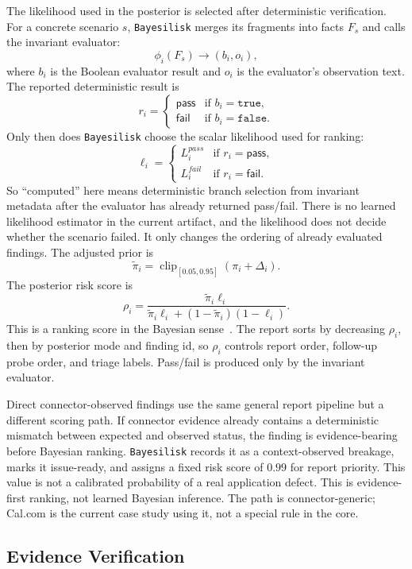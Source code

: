 \documentclass[10pt]{article}
\newcommand{\tool}{\texttt{Bayesilisk}\xspace}
\newcommand{\Pass}{\mathsf{pass}}
\newcommand{\Fail}{\mathsf{fail}}
\begin{document}
The likelihood used in the posterior is selected after deterministic
verification. For a concrete scenario \(s\), \tool merges its fragments into
facts \(F_s\) and calls the invariant evaluator:
\[
  \phi_i(F_s) \rightarrow (b_i,o_i),
\]
where \(b_i\) is the Boolean evaluator result and \(o_i\) is the evaluator's
observation text. The reported deterministic result is
\[
  r_i =
  \begin{cases}
    \Pass & \text{if } b_i=\texttt{true},\\
    \Fail & \text{if } b_i=\texttt{false}.
  \end{cases}
\]
Only then does \tool choose the scalar likelihood used for ranking:
\[
  \ell_i =
  \begin{cases}
    L_i^{pass} & \text{if } r_i=\Pass,\\
    L_i^{fail} & \text{if } r_i=\Fail.
  \end{cases}
\]
So ``computed'' here means deterministic branch selection from invariant
metadata after the evaluator has already returned pass/fail. There is no learned
likelihood estimator in the current artifact, and the likelihood does not
decide whether the scenario failed. It only changes the ordering of already
evaluated findings. The adjusted prior is
\[
  \tilde{\pi}_i = \operatorname{clip}_{[0.05,0.95]}(\pi_i + \Delta_i).
\]
The posterior risk score is
\[
  \rho_i =
  \frac{\tilde{\pi}_i \ell_i}
       {\tilde{\pi}_i \ell_i + (1-\tilde{\pi}_i)(1-\ell_i)}.
\]
This is a ranking score in the Bayesian sense~\cite{bishop2006pattern}. The
report sorts by decreasing \(\rho_i\), then by posterior mode and finding id,
so \(\rho_i\) controls report order, follow-up probe order, and triage labels.
Pass/fail is produced only by the invariant evaluator.

Direct connector-observed findings use the same general report pipeline but a
different scoring path. If connector evidence already contains a deterministic
mismatch between expected and observed status, the finding is evidence-bearing
before Bayesian ranking. \tool records it as a context-observed breakage, marks
it issue-ready, and assigns a fixed risk score of \(0.99\) for report priority.
This value is not a calibrated probability of a real application defect.
This is evidence-first
ranking, not learned Bayesian inference. The path is connector-generic; Cal.com
is the current case study using it, not a special rule in the core.

\subsection{Evidence Verification}
\end{document}
